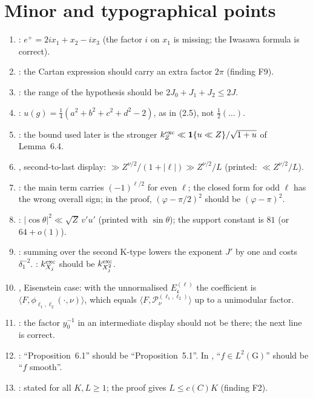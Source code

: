 \documentclass[11pt]{amsart}
\theoremstyle{remark}
\theoremstyle{definition}
\numberwithin{equation}{section}
\newcommand{\G}{\mathrm{G}}
\newcommand{\K}{\mathrm{K}}
\newcommand{\one}{\mathbf{1}}
\newcommand{\br}[1]{\langle #1\rangle}
\newcommand{\Pc}{\mathcal{P}}
\begin{document}
\section{Minor and typographical points}\label{app:typos}
\begin{enumerate}
\item \cite[\S2.2]{GM1}: $e^+=2ix_1+x_2-ix_3$ (the factor $i$ on $x_1$ is missing; the Iwasawa formula is correct).
\item \cite[(2.14)]{GM1}: the Cartan expression should carry an extra factor $2\pi$ (finding F9).
\item \cite[(5.1)]{GM1}: the range of the hypothesis should be $2J_0+J_1+J_2\le2J$.
\item \cite[\S6.1]{GM1}: $u(g)=\frac14(a^2+b^2+c^2+d^2-2)$, as in (2.5), not $\frac12(\dots)$.
\item \cite[(6.1)]{GM1}: the bound used later is the stronger $k_Z^{\rm exc}\ll\one\{u\ll Z\}/\sqrt{1+u}$ of Lemma~6.4.
\item \cite[Prop.~6.2]{GM1}, second-to-last display: $\gg Z^{\nu/2}/(1+|\ell|)\gg Z^{\nu/2}/L$ (printed: $\ll Z^{\nu/2}/L$).
\item \cite[Lemma~4.3]{GM1}: the main term carries $(-1)^{\ell/2}$ for even $\ell$; the closed form for odd $\ell$ has the wrong overall sign; in the proof, $(\varphi-\pi/2)^2$ should be $(\varphi-\pi)^2$.
\item \cite[proof of Lemma~6.4]{GM1}: $|\cos\theta|^2\ll\sqrt Z\,v'u'$ (printed with $\sin\theta$); the support constant is $81$ (or $64+o(1)$).
\item \cite[\S7.3]{GM1}: summing over the second $\K$-type lowers the exponent $J'$ by one and costs $\delta_1^{-2}$. \cite[\S7.4]{GM1}: $k^{\rm exc}_{X_j}$ should be $k^{\rm exc}_{X_j^2}$.
\item \cite[Prop.~3.2]{GM1}, Eisenstein case: with the unnormalised $E^{(\ell)}_{\mathfrak c}$ the coefficient is $\br{F,\phi_{\ell_1,\ell_2}(\cdot,\nu)}$, which equals $\br{F,\Pc^{(\ell_1,\ell_2)}_\nu}$ up to a unimodular factor.
\item \cite[Lemma~6.3]{GM0}: the factor $y_0^{-1}$ in an intermediate display should not be there; the next line is correct.
\item \cite[proof of Prop.~5.1]{GM0}: ``Proposition~6.1'' should be ``Proposition~5.1''. In \cite[Lemma~5.10]{GM0}, ``$f\in L^2(\G)$'' should be ``$f$ smooth''.
\item \cite[Prop.~6.1]{GM0}: stated for all $K,L\ge1$; the proof gives $L\le c(C)K$ (finding F2).
\end{enumerate}
\end{document}
